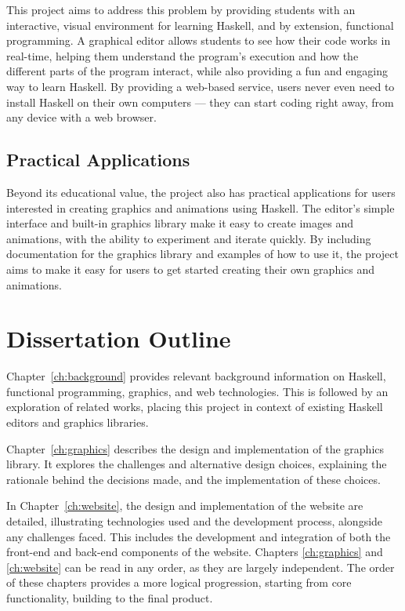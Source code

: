\documentclass[../main.tex]{subfiles}
\begin{document}
            This project aims to address this problem by providing students with an
                interactive, visual environment for learning Haskell, and by extension,
                functional programming.
            A graphical editor allows students to see how their code works in real-time,
                helping them understand the program's execution and how the different parts of
                the program interact, while also providing a fun and engaging way to learn
                Haskell.
            By providing a web-based service, users never even need to install Haskell on
                their own computers — they can start coding right away, from any device with a
                web browser.

        \subsection{Practical Applications}
            Beyond its educational value, the project also has practical applications for
                users interested in creating graphics and animations using Haskell.
            The editor's simple interface and built-in graphics library make it easy to
                create images and animations, with the ability to experiment and iterate
                quickly.
            By including documentation for the graphics library and examples of how to use
                it, the project aims to make it easy for users to get started creating their
                own graphics and animations.

    \section{Dissertation Outline}
        Chapter~\ref{ch:background} provides relevant background information on
            Haskell, functional programming, graphics, and web technologies.
        This is followed by an exploration of related works, placing this project in
            context of existing Haskell editors and graphics libraries.

        Chapter~\ref{ch:graphics} describes the design and implementation of the
            graphics library.
        It explores the challenges and alternative design choices, explaining the
            rationale behind the decisions made, and the implementation of these choices.

        In Chapter~\ref{ch:website}, the design and implementation of the website are
            detailed, illustrating technologies used and the development process, alongside
            any challenges faced.
        This includes the development and integration of both the front-end and
            back-end components of the website.
        Chapters \ref{ch:graphics} and \ref{ch:website} can be read in any order, as
            they are largely independent.
        The order of these chapters provides a more logical progression, starting from
            core functionality, building to the final product.
\end{document}
